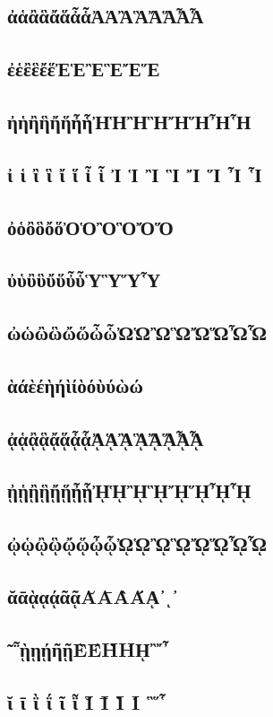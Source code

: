 \documentclass{article}
\begin{document}
\subsection{ἀἁἂἃἄἅἆἇἈἉἊἋἌἍἎἏ}
\subsection{ἐἑἒἓἔἕἘἙἚἛἜἝ}
\subsection{ἠἡἢἣἤἥἦἧἨἩἪἫἬἭἮἯ}
\subsection{ἰ ἱ ἲ ἳ ἴ ἵ ἶ ἷ Ἰ Ἱ Ἲ Ἳ Ἴ Ἵ Ἶ Ἷ}
\subsection{ὀὁὂὃὄὅὈὉὊὋὌὍ}
\subsection{ὐὑὒὓὔὕὖὗὙὛὝὟ}
\subsection{ὠὡὢὣὤὥὦὧὨὩὪὫὬὭὮὯ}
\subsection{ὰάὲέὴήὶίὸόὺύὼώ}
\subsection{ᾀᾁᾂᾃᾄᾅᾆᾇᾈᾉᾊᾋᾌᾍᾎᾏ}
\subsection{ᾐᾑᾒᾓᾔᾕᾖᾗᾘᾙᾚᾛᾜᾝᾞᾟ}
\subsection{ᾠᾡᾢᾣᾤᾥᾦᾧᾨᾩᾪᾫᾬᾭᾮᾯ}
\subsection{ᾰᾱᾲᾳᾴᾶᾷᾸᾹᾺΆᾼ᾽ι᾿}
\subsection{῀῁ῂῃῄῆῇῈΈῊΉῌ῍῎῏}
\subsection{ῐ ῑ ῒ ΐ ῖ ῗ Ῐ Ῑ Ὶ Ί ῝῞῟}
\end{document}
